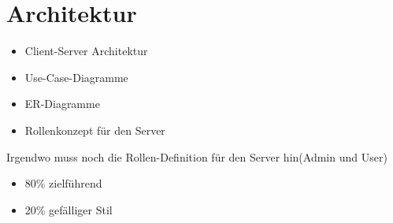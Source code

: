 \chapter{Architektur}
\label{cha:architektur}

\begin{itemize}
\item Client-Server Architektur
\item Use-Case-Diagramme
\item ER-Diagramme
\item Rollenkonzept für den Server
\end{itemize}

Irgendwo muss noch die Rollen-Definition für den Server hin(Admin und User)

\begin{itemize}
\item 80\% zielführend
\item 20\% gefälliger Stil
\end{itemize}